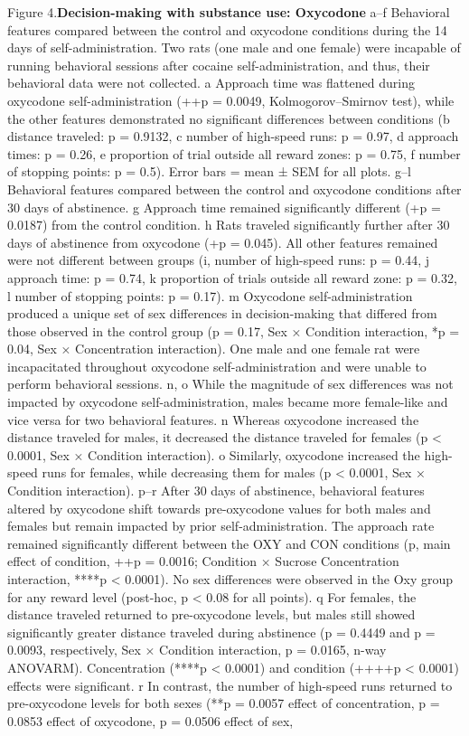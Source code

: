 \documentclass{article}
\begin{document}
\captionsetup{font = scriptsize, type=figure}  %
\begin{singlespace}
\noindent Figure 4.\textbf{Decision-making with substance use: Oxycodone} a–f Behavioral features compared between the control and oxycodone conditions during the 14 days of self-administration. Two rats (one male and one female) were incapable of running behavioral sessions after cocaine self-administration, and thus, their behavioral data were not collected. a Approach time was flattened during oxycodone self-administration (++p = 0.0049, Kolmogorov–Smirnov test), while the other features demonstrated no significant differences between conditions (b distance traveled: p = 0.9132, c number of high-speed runs: p = 0.97, d approach times: p = 0.26, e proportion of trial outside all reward zones: p = 0.75, f number of stopping points: p = 0.5). Error bars = mean ± SEM for all plots. g–l Behavioral features compared between the control and oxycodone conditions after 30 days of abstinence. g Approach time remained significantly different (+p = 0.0187) from the control condition. h Rats traveled significantly further after 30 days of abstinence from oxycodone (+p = 0.045). All other features remained were not different between groups (i, number of high-speed runs: p = 0.44, j approach time: p = 0.74, k proportion of trials outside all reward zone: p = 0.32, l number of stopping points: p = 0.17). m Oxycodone self-administration produced a unique set of sex differences in decision-making that differed from those observed in the control group (p = 0.17, Sex × Condition interaction, *p = 0.04, Sex × Concentration interaction). One male and one female rat were incapacitated throughout oxycodone self-administration and were unable to perform behavioral sessions. n, o While the magnitude of sex differences was not impacted by oxycodone self-administration, males became more female-like and vice versa for two behavioral features. n Whereas oxycodone increased the distance traveled for males, it decreased the distance traveled for females (p < 0.0001, Sex × Condition interaction). o Similarly, oxycodone increased the high-speed runs for females, while decreasing them for males (p < 0.0001, Sex × Condition interaction). p–r After 30 days of abstinence, behavioral features altered by oxycodone shift towards pre-oxycodone values for both males and females but remain impacted by prior self-administration. The approach rate remained significantly different between the OXY and CON conditions (p, main effect of condition, ++p = 0.0016; Condition × Sucrose Concentration interaction, ****p < 0.0001). No sex differences were observed in the Oxy group for any reward level (post-hoc, p < 0.08 for all points). q For females, the distance traveled returned to pre-oxycodone levels, but males still showed significantly greater distance traveled during abstinence (p = 0.4449 and p = 0.0093, respectively, Sex × Condition interaction, p = 0.0165, n-way ANOVARM). Concentration (****p < 0.0001) and condition (++++p < 0.0001) effects were significant. r In contrast, the number of high-speed runs returned to pre-oxycodone levels for both sexes (**p = 0.0057 effect of concentration, p = 0.0853 effect of oxycodone, p = 0.0506 effect of sex, 
\end{singlespace}
\end{document}
